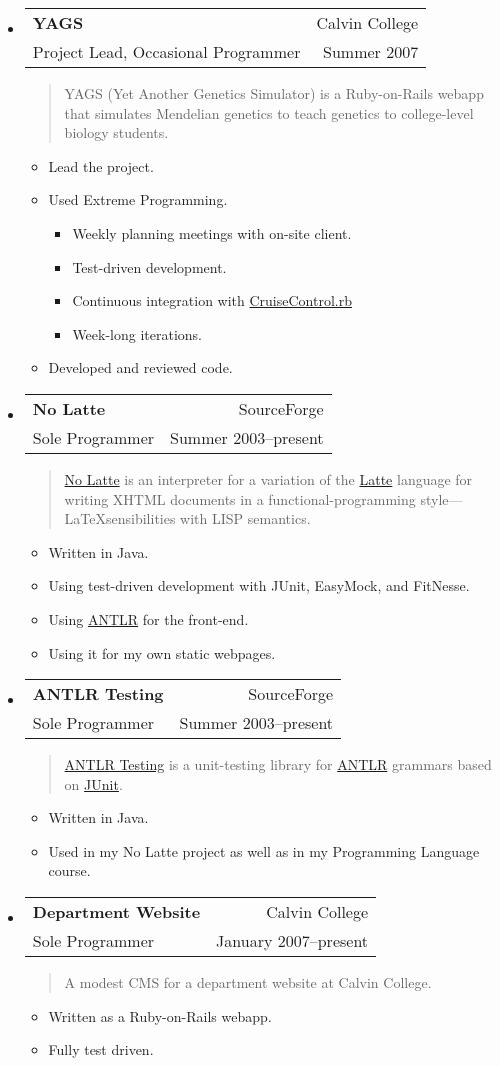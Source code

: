 \documentclass[letterpaper,11pt]{article}
\makeatletter
\newcommand{\resitem}[1]{\item #1 \vspace{-2pt}}
\newcommand{\ressubheading}[4]{ 
\begin{tabular*}{6.5in}{l@{\extracolsep{\fill}}r}
	\textbf{#1} & #2 \\
	{#3} & {#4} \\
\end{tabular*}
\vspace{-6pt}}
\newenvironment{comment}{
\begin{quote}\it
}{
\end{quote}
}
\makeatother
\begin{document}
\begin{itemize}
	
	\item \ressubheading{YAGS}{Calvin College}{Project Lead, Occasional Programmer}{Summer 2007}
		\begin{comment}
			YAGS (Yet Another Genetics Simulator) is a Ruby-on-Rails webapp that simulates Mendelian genetics to teach genetics to college-level biology students.
		\end{comment}
		\begin{itemize}
			\resitem{Lead the project.}
			\resitem{Used Extreme Programming.}
				\begin{itemize}
					\resitem{Weekly planning meetings with on-site client.}
					\resitem{Test-driven development.}
					\resitem{Continuous integration with \href{http://cruisecontrolrb.thoughtworks.com/}{CruiseControl.rb}}
					\resitem{Week-long iterations.}
				\end{itemize}
			\resitem{Developed and reviewed code.}
		\end{itemize}
	
	\item \ressubheading{No Latte}{SourceForge}{Sole Programmer}{Summer 2003--present}
	  \begin{comment}
	  	\href{http://nolatte.sourceforge.net/}{No Latte} is an interpreter for a variation of the \href{http://www.latte.org}{Latte} language for writing XHTML documents in a functional-programming style---\LaTeX sensibilities with LISP semantics.
	  \end{comment}
		\begin{itemize}
			\resitem{Written in Java.}
			\resitem{Using test-driven development with JUnit, EasyMock, and FitNesse.}
			\resitem{Using \href{http://www.antlr.org/}{ANTLR} for the front-end.}
			\resitem{Using it for my own static webpages.}
		\end{itemize}
	
	\item \ressubheading{ANTLR Testing}{SourceForge}{Sole Programmer}{Summer 2003--present}
		\begin{comment}
			\href{http://antlr-testing.sourceforge.net/}{ANTLR Testing} is a unit-testing library for \href{http://www.antlr.org/}{ANTLR} grammars based on \href{http://junit.org/}{JUnit}.
		\end{comment}
		\begin{itemize}
			\resitem{Written in Java.}
			\resitem{Used in my No Latte project as well as in my Programming Language course.}
		\end{itemize}
	
	\item \ressubheading{Department Website}{Calvin College}{Sole Programmer}{January 2007--present}
	  \begin{comment}
	  	A modest CMS for a department website at Calvin College.
	  \end{comment}
	  \begin{itemize}
	  	\resitem{Written as a Ruby-on-Rails webapp.}
			\resitem{Fully test driven.}
	  \end{itemize}

\end{itemize}
\end{document}
